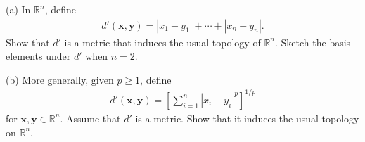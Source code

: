   \begin{exercise}[Munkres 20.1]
    (a) In $\mathbb{R}^n$, define
    \begin{align*}
      d'(\mathbf{x}, \mathbf{y}) = |x_1 - y_1| + \cdots + |x_n - y_n|.
    \end{align*}
    Show that $d'$ is a metric that induces the usual topology of $\mathbb{R}^n$. Sketch the basis elements under $d'$ when $n = 2$.
    
    (b) More generally, given $p \geq 1$, define
    \begin{align*}
      d'(\mathbf{x}, \mathbf{y}) = \left[\sum_{i=1}^{n} |x_i - y_i|^p\right]^{1/p}
    \end{align*}
    for $\mathbf{x}, \mathbf{y} \in \mathbb{R}^n$. Assume that $d'$ is a metric. Show that it induces the usual topology on $\mathbb{R}^n$.
  \end{exercise}
